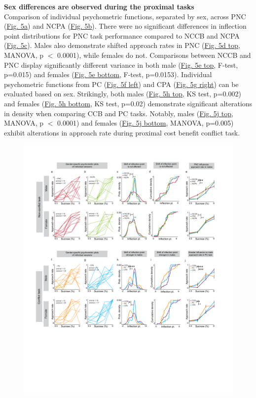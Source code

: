 \documentclass{article}
\begin{document}
\vspace{1em}

\noindent\textbf{Sex differences are observed during the proximal tasks}\\
Comparison of individual psychometric functions, separated by sex, across PNC (\hyperref[fig:alcohol_main_5]{Fig. 5a}) and NCPA (\hyperref[fig:alcohol_main_5]{Fig. 5b}). There were no significant differences in inflection point distributions for PNC task performance compared to NCCB and NCPA (\hyperref[fig:alcohol_main_5]{Fig. 5c}). Males also demonstrate shifted approach rates in PNC (\hyperref[fig:alcohol_main_5]{Fig. 5d top}, MANOVA, p $<$ 0.0001), while females do not. Comparisons between NCCB and PNC display significantly different variance in both male (\hyperref[fig:alcohol_main_5]{Fig. 5e top}, F-test, p=0.015) and females (\hyperref[fig:alcohol_main_5]{Fig. 5e bottom}, F-test, p=0.0153). Individual psychometric functions from PC (\hyperref[fig:alcohol_main_5]{Fig. 5f left}) and CPA (\hyperref[fig:alcohol_main_5]{Fig. 5g right}) can be evaluated based on sex. Strikingly, both males (\hyperref[fig:alcohol_main_5]{Fig. 5h top}, KS test, p=0.002) and females (\hyperref[fig:alcohol_main_5]{Fig. 5h bottom}, KS test, p=0.02) demonstrate significant alterations in density when comparing CCB and PC tasks. Notably, males (\hyperref[fig:alcohol_main_5]{Fig. 5j top}, MANOVA, p $<$ 0.0001) and females (\hyperref[fig:alcohol_main_5]{Fig. 5j bottom}, MANOVA, p=0.005) exhibit alterations in approach rate during proximal cost benefit conflict task.

\begin{figure}[H] %
  \centering
  \includegraphics[width=\textwidth, trim=50 100 50 100]{Figs/Alcohol_main_5.pdf}
\end{figure}
\end{document}
